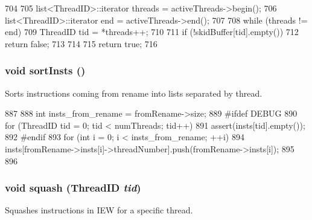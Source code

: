 \begin{DoxyCode}
704 {
705     list<ThreadID>::iterator threads = activeThreads->begin();
706     list<ThreadID>::iterator end = activeThreads->end();
707 
708     while (threads != end) {
709         ThreadID tid = *threads++;
710 
711         if (!skidBuffer[tid].empty())
712             return false;
713     }
714 
715     return true;
716 }
\end{DoxyCode}
\hypertarget{classDefaultIEW_a9ff2aa32ab0f40674cb3518108d62f8e}{
\subsubsection[{sortInsts}]{\setlength{\rightskip}{0pt plus 5cm}void sortInsts ()}}
\label{classDefaultIEW_a9ff2aa32ab0f40674cb3518108d62f8e}
Sorts instructions coming from rename into lists separated by thread. 


\begin{DoxyCode}
887 {
888     int insts_from_rename = fromRename->size;
889 #ifdef DEBUG
890     for (ThreadID tid = 0; tid < numThreads; tid++)
891         assert(insts[tid].empty());
892 #endif
893     for (int i = 0; i < insts_from_rename; ++i) {
894         insts[fromRename->insts[i]->threadNumber].push(fromRename->insts[i]);
895     }
896 }
\end{DoxyCode}
\hypertarget{classDefaultIEW_ad33d65c18c323d90695d7c2355b49af9}{
\subsubsection[{squash}]{\setlength{\rightskip}{0pt plus 5cm}void squash ({\bf ThreadID} {\em tid})}}
\label{classDefaultIEW_ad33d65c18c323d90695d7c2355b49af9}
Squashes instructions in IEW for a specific thread. 


